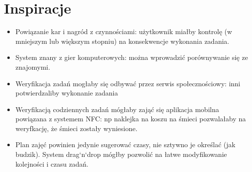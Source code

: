 \documentclass[11pt,wide]{mwart}
\begin{document}
\section{Inspiracje}
\begin{itemize}
  \item Powiązanie kar i nagród z czynnościami: użytkownik miałby kontrolę (w mniejszym lub większym stopniu) na konsekwencje wykonania zadania.
  \item System znany z gier komputerowych: można wprowadzić porównywanie się ze znajomymi.
  \item Weryfikacja zadań mogłaby się odbywać przez serwis społecznościowy: inni potwierdzaliby wykonanie zadania
  \item Weryfikacją codziennych zadań mógłaby zająć się aplikacja mobilna powiązana z systemem NFC: np naklejka na koszu na śmieci pozwalałaby na weryfkację, że śmieci zostały wyniesione.
  \item Plan zajęć powinien jedynie sugerować czasy, nie sztywno je określać (jak budzik). System drag`n`drop mógłby pozwolić na łatwe modyfikowanie kolejności i czasu zadań.
\end{itemize}
\end{document}
